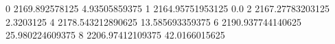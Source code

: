 0 2169.892578125 4.93505859375
1 2164.95751953125 0.0
2 2167.27783203125 2.3203125
4 2178.543212890625 13.585693359375
6 2190.937744140625 25.980224609375
8 2206.97412109375 42.0166015625
